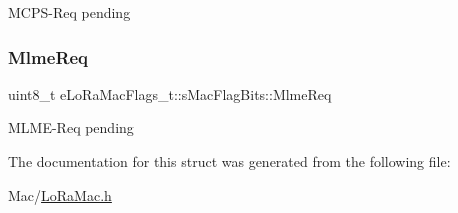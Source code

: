 M\+C\+P\+S-\/\+Req pending \mbox{\label{structeLoRaMacFlags__t_1_1sMacFlagBits_aa8fd4d4d7a676bc65424243f1d4632dc}} 
\subsubsection{\texorpdfstring{Mlme\+Req}{MlmeReq}}
{\footnotesize\ttfamily uint8\+\_\+t e\+Lo\+Ra\+Mac\+Flags\+\_\+t\+::s\+Mac\+Flag\+Bits\+::\+Mlme\+Req}

M\+L\+M\+E-\/\+Req pending 

The documentation for this struct was generated from the following file\+:\begin{DoxyCompactItemize}
\item 
Mac/\hyperlink{LoRaMac_8h}{Lo\+Ra\+Mac.\+h}\end{DoxyCompactItemize}
